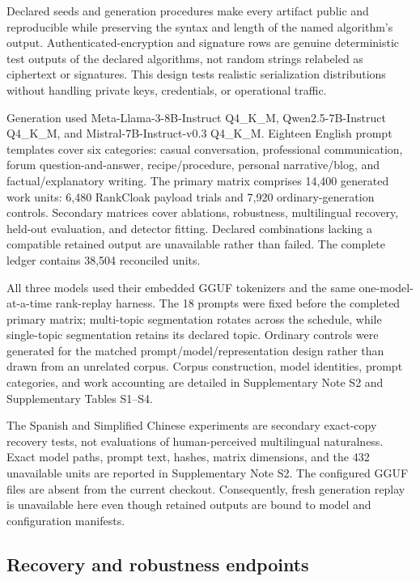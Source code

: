 \documentclass[fleqn,10pt]{wlscirep}
\begin{document}
Declared seeds and generation procedures make every artifact public and reproducible while preserving the syntax and length of the named algorithm's output. Authenticated-encryption and signature rows are genuine deterministic test outputs of the declared algorithms, not random strings relabeled as ciphertext or signatures. This design tests realistic serialization distributions without handling private keys, credentials, or operational traffic.

Generation used Meta-Llama-3-8B-Instruct Q4\_K\_M, Qwen2.5-7B-Instruct Q4\_K\_M, and Mistral-7B-Instruct-v0.3 Q4\_K\_M. Eighteen English prompt templates cover six categories: casual conversation, professional communication, forum question-and-answer, recipe/procedure, personal narrative/blog, and factual/explanatory writing. The primary matrix comprises 14,400 generated work units: 6,480 RankCloak payload trials and 7,920 ordinary-generation controls. Secondary matrices cover ablations, robustness, multilingual recovery, held-out evaluation, and detector fitting. Declared combinations lacking a compatible retained output are unavailable rather than failed. The complete ledger contains 38,504 reconciled units.

All three models used their embedded GGUF tokenizers and the same one-model-at-a-time rank-replay harness. The 18 prompts were fixed before the completed primary matrix; multi-topic segmentation rotates across the schedule, while single-topic segmentation retains its declared topic. Ordinary controls were generated for the matched prompt/model/representation design rather than drawn from an unrelated corpus. Corpus construction, model identities, prompt categories, and work accounting are detailed in Supplementary Note S2 and Supplementary Tables S1--S4.

The Spanish and Simplified Chinese experiments are secondary exact-copy recovery tests, not evaluations of human-perceived multilingual naturalness. Exact model paths, prompt text, hashes, matrix dimensions, and the 432 unavailable units are reported in Supplementary Note S2. The configured GGUF files are absent from the current checkout. Consequently, fresh generation replay is unavailable here even though retained outputs are bound to model and configuration manifests.

\subsection*{Recovery and robustness endpoints}\label{sec:endpoint-method}
\end{document}
